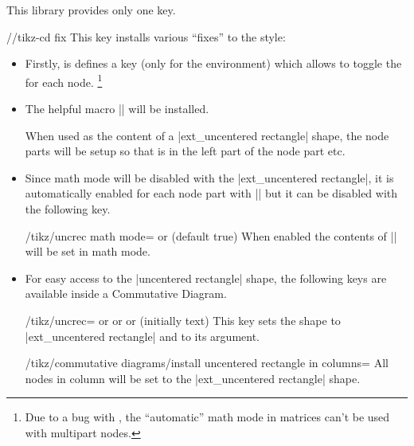 This library provides only one key.
\begin{stylekey}{/\tikzext/tikz-cd fix}
This key installs various \enquote{fixes} to the  style:

\begin{itemize}
\item Firstly, is defines a  key (only for the  environment)
      which allows to toggle the  for each node.%
      \footnote{Due to a bug with , the \enquote{automatic} math mode in matrices can't be used
        with multipart nodes.}
\item The helpful macro |\uncrec| will be installed.
\begin{command}{\uncrec{}}
  When used as the content of a |ext_uncentered rectangle| shape,
  the node parts will be setup so that  is in the left part of the node part etc.
\end{command}
\item Since math mode will be disabled with the |ext_uncentered rectangle|, it is automatically enabled for each node part with |\uncrec| but it can be disabled with the following key.
\begin{key}{/tikz/uncrec math mode=\textrm{ or } (default true)}
When enabled the contents of |\uncrec| will be set in math mode.
\end{key}
\item For easy access to the |uncentered rectangle| shape, the following keys are available inside a Commutative Diagram.
\begin{stylekey}{/tikz/uncrec=\textrm{ or }\textrm{ or }\textrm{ or } (initially text)}
This key sets the shape to |ext_uncentered rectangle| and  to its argument.
\end{stylekey}
\begin{stylekey}{/tikz/commutative diagrams/install uncentered rectangle in columns=}
All nodes in column  will be set to the |ext_uncentered rectangle| shape.
\end{stylekey}
\end{itemize}
\end{stylekey}

